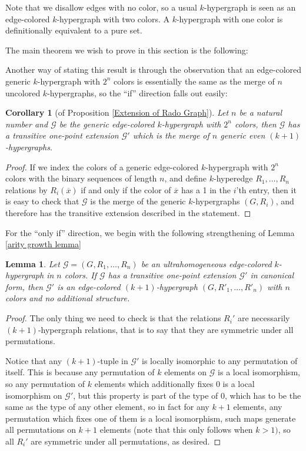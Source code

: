 \documentclass{amsart}
\newtheorem{lemma}[theorem]{Lemma}
\newtheorem{corollary}[theorem]{Corollary}
\def\graph{\mathcal{G}}
\begin{document}
Note that we disallow edges with no color, so a usual $k$-hypergraph is seen as an edge-colored $k$-hypergraph with two colors. A $k$-hypergraph with one color is definitionally equivalent to a pure set.

The main theorem we wish to prove in this section is the following:

\maintheoremone*

Another way of stating this result is through the observation that an edge-colored generic $k$-hypergraph with $2^n$ colors is essentially the same as the merge of $n$ uncolored $k$-hypergraphs, so the ``if'' direction falls out easily:

\begin{corollary}[of Proposition \ref{Extension of Rado Graph}]\label{if direction of graph theorem}
    Let $n$ be a natural number and $\graph$ be the generic edge-colored $k$-hypergraph with $2^n$ colors, then $\graph$ has a transitive one-point extension $\graph'$ which is the merge of $n$ generic even $(k+1)$-hypergraphs.
\end{corollary}
\begin{proof}
    If we index the colors of a generic edge-colored $k$-hypergraph with $2^n$ colors with the binary sequences of length $n$, and define $k$-hyperedge $R_1, \dots, R_n$ relations by $R_i(\overline{x})$ if and only if the color of $\overline{x}$ has a 1 in the $i$'th entry, then it is easy to check that $\graph$ is the merge of the generic $k$-hypergraphs $(G, R_i)$, and therefore has the transitive extension described in the statement.
\end{proof}



For the ``only if'' direction, we begin with the following strengthening of Lemma \ref{arity growth lemma}
\begin{lemma}\label{Conditions for generic Graph extensions}
    Let $\graph = (G, R_1, \dots, R_n)$ be an ultrahomogeneous edge-colored $k$-hypergraph in $n$ colors. If $\graph$ has a transitive one-point extension $\graph'$ in canonical form, then $\graph'$ is an edge-colored $(k+1)$-hypergraph $(G, R'_1, \dots, R'_n)$ with $n$ colors and no additional structure.
\end{lemma}
\begin{proof}
    The only thing we need to check is that the relations $R_i'$ are necessarily $(k+1)$-hypergraph relations, that is to say that they are symmetric under all permutations.
    
    Notice that any $(k+1)$-tuple in $\graph'$ is locally isomorphic to any permutation of itself. This is because any permutation of $k$ elements on $\graph$ is a local isomorphism, so any permutation of $k$ elements which additionally fixes 0 is a local isomorphism on $\graph'$, but this property is part of the type of $0$, which has to be the same as the type of any other element, so in fact for any $k+1$ elements, any permutation which fixes one of them is a local isomorphism, such maps generate all permutations on $k+1$ elements (note that this only follows when $k>1)$, so all $R_i'$ are symmetric under all permutations, as desired.
\end{proof}
\end{document}
